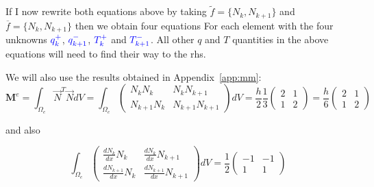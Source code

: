 If I now rewrite both equations above by taking $\tilde{f}=\{N_k,N_{k+1} \}$ and 
$\overline{f}=\{N_k,N_{k+1}\}$ then we obtain four equations  
For each element with the four unknowns ${\color{blue} q_k^+}$, ${\color{blue} q_{k+1}^-}$, 
${\color{blue}T_k^+}$ and ${\color{blue}T_{k+1}^-}$. 
All other $q$ and $T$ quantities in the above equations will need to find their way to the rhs. 

We will also use the results obtained in Appendix~\ref{app:mm}:
\[
{\bm M}^e
=\int_{\Omega_e} \vec{N}^T \vec{N} dV
=\int_{\Omega_e} 
\left(
\begin{array}{cc}
N_k N_k & N_k N_{k+1} \\
N_{k+1} N_k & N_{k+1}N_{k+1}
\end{array}
\right)
dV 
= \frac{h}{2} \frac{1}{3} 
\left(
\begin{array}{cc}
2  & 1 \\
1 & 2
\end{array}
\right)
= 
\frac{h}{6}
\left(
\begin{array}{cc}
2  & 1 \\
1 & 2
\end{array}
\right)
\]

and also 

\[
\int_{\Omega_e} 
\left(
\begin{array}{cc}
\frac{dN_k}{dx} N_k     & \frac{dN_k}{dx} N_{k+1} \\
\frac{dN_{k+1}}{dx} N_k & \frac{dN_{k+1}}{dx} N_{k+1}
\end{array}
\right)
dV
=
\frac{1}{2}
\left(
\begin{array}{cc}
-1  & -1 \\
1 & 1
\end{array}
\right)
\]





%


